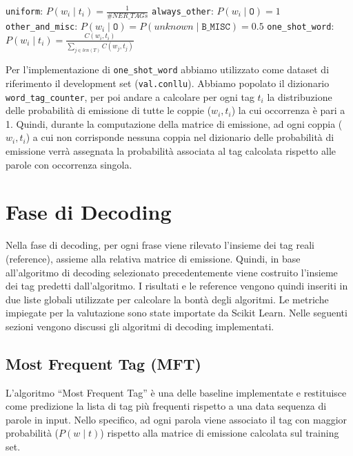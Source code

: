 \begin{outline}[enumerate]
    \1 \texttt{uniform}: $P(w_i \mid t_i) = \frac{1}{\#NER\_TAGs}$
    \1 \texttt{always\_other}: $P(w_i \mid \mathtt{O}) = 1$
    \1 \texttt{other\_and\_misc}: $P(w_i \mid \mathtt{O}) = P(unknown \mid \mathtt{B\_MISC}) = 0.5$
    \1 \texttt{one\_shot\_word}: {$P(w_i \mid t_i) = \frac{C(w_i,t_i)}{\sum_{j \in len(T)}{C(w_j,t_j)}}$}
\end{outline}
Per l'implementazione di \texttt{one\_shot\_word} abbiamo utilizzato come dataset di riferimento il development set (\texttt{val.conllu}). Abbiamo popolato il dizionario \texttt{word\_tag\_counter}, per poi andare a calcolare per ogni tag $t_i$ la distribuzione delle probabilità di emissione di tutte le coppie ($w_i,t_i$) la cui occorrenza è pari a 1. Quindi, durante la computazione della matrice di emissione, ad ogni coppia ($w_i,t_i$) a cui non corrisponde nessuna coppia nel dizionario delle probabilità di emissione verrà assegnata la probabilità associata al tag calcolata rispetto alle parole con occorrenza singola.


\chapter{Fase di Decoding}
Nella fase di decoding, per ogni frase viene rilevato l'insieme dei tag reali (reference), assieme alla relativa matrice di emissione. Quindi, in base all'algoritmo di decoding selezionato precedentemente viene costruito l'insieme dei tag predetti dall'algoritmo. I risultati e le reference vengono quindi inseriti in due liste globali utilizzate per calcolare la bontà degli algoritmi. Le metriche impiegate per la valutazione sono state importate da Scikit Learn.
Nelle seguenti sezioni vengono discussi gli algoritmi di decoding implementati.

\section{Most Frequent Tag (MFT)}
L'algoritmo ``Most Frequent Tag'' è una delle baseline implementate e restituisce come predizione la lista di tag più frequenti rispetto a una data sequenza di parole in input. Nello specifico, ad ogni parola viene associato il tag con maggior probabilità ($P(w \mid t)$) rispetto alla matrice di emissione calcolata sul training set.

